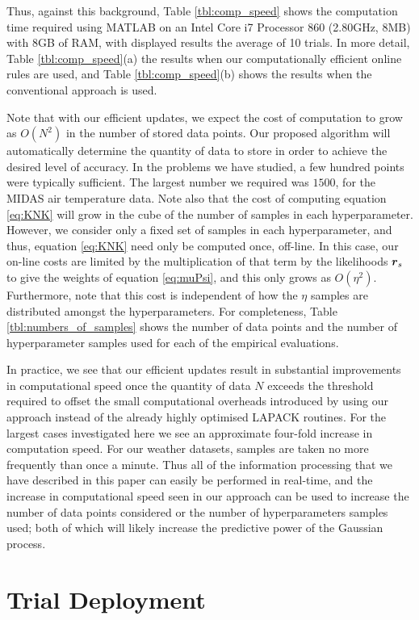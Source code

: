 \documentclass{acmsmall}
\begin{document}
Thus, against this background, Table \ref{tbl:comp_speed} shows the computation time required using MATLAB on an Intel Core i7 Processor 860 (2.80GHz, 8MB) with 8GB of RAM, with displayed results the average of 10 trials. In more detail, Table \ref{tbl:comp_speed}(a) the results when our computationally efficient online rules are used, and Table \ref{tbl:comp_speed}(b) shows the results when the conventional approach is used.

Note that with our efficient updates, we expect the cost of computation to grow as $O(N^2)$ in the number of stored data points. Our proposed algorithm will automatically determine the quantity of data to store in order to achieve the desired level of accuracy. In the problems we have studied, a few hundred points were typically sufficient. The largest number we required was $1500$, for the MIDAS air temperature data. Note also that the cost of computing equation \eqref{eq:KNK} will grow in the cube of the number of samples in each hyperparameter. However, we consider only a fixed set of samples in each hyperparameter, and thus, equation \eqref{eq:KNK} need only be computed once, off-line. In this case, our on-line costs are limited by the multiplication of that term by the likelihoods $\boldsymbol{r}_s$ to give the weights of equation \eqref{eq:muPsi}, and this only grows as $O(\eta^2)$. Furthermore, note that this cost is independent of how the $\eta$ samples are distributed amongst the hyperparameters. For completeness, Table \ref{tbl:numbers_of_samples} shows the number of data points and the number of hyperparameter samples used for each of the empirical evaluations.


In practice, we see that our efficient updates result in substantial improvements in computational speed once the quantity of data $N$ exceeds the threshold required to offset the small computational overheads introduced by using our approach instead of the already highly optimised LAPACK routines. For the largest cases investigated here we see an approximate four-fold increase in computation speed. For our weather datasets, samples are taken no more frequently than once a minute. Thus all of the information processing that we have described in this paper can easily be performed in real-time, and the increase in computational speed seen in our approach can be used to increase the number of data points considered or the number of hyperparameters samples used; both of which will likely increase the predictive power of the Gaussian process.

\section{Trial Deployment}\label{sec_implementation}
\end{document}
